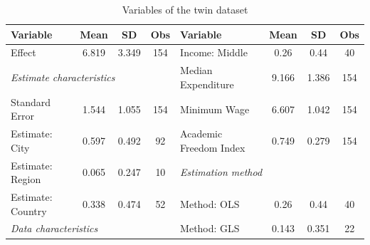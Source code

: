 \begin{table}[!htbp]
    \centering
    \scriptsize
    \singlespace
    \caption{Variables of the twin dataset}
    \label{tab:twins_new_vars}
    \begin{tabular}
        {
            @{\hskip\tabcolsep\extracolsep}
            l
            *{3}{c}
            |
            l
                *{3}{c}
            @{}
        }
        \toprule
        Variable                                                                & Mean   & SD                  & Obs   & Variable                                                               & Mean  & SD    & Obs \\
        \midrule
        Effect                                                                  & 6.819  & 3.349               & 154   & Income: Middle                                                         & 0.26  & 0.44  & 40  \\
        \multicolumn{3}{l}{\textit{\hspace{0.1cm}Estimate characteristics}}     &        & Median Expenditure  & 9.166 & 1.386                                                                  & 154                 \\
        Standard Error                                                          & 1.544  & 1.055               & 154   & Minimum Wage                                                           & 6.607 & 1.042 & 154 \\
        Estimate: City                                                          & 0.597  & 0.492               & 92    & Academic Freedom Index                                                 & 0.749 & 0.279 & 154 \\
        Estimate: Region                                                        & 0.065  & 0.247               & 10    & \multicolumn{3}{l}{\textit{\hspace{0.1cm}Estimation method}}           &                     \\
        Estimate: Country                                                       & 0.338  & 0.474               & 52    & Method: OLS                                                            & 0.26  & 0.44  & 40  \\
        \multicolumn{3}{l}{\textit{\hspace{0.1cm}Data characteristics}}         &        & Method: GLS         & 0.143 & 0.351                                                                  & 22                  \\

\end{tabular}
\end{table}
